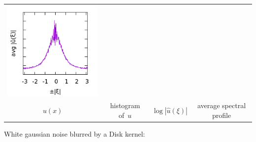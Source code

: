 \begin{tabular}{cccc}
	\includegraphics{l256_p.png} \\
	$u(x)$ &
	histogram of~$u$ &
	$\log|\hat u(\xi)|$ &
	average spectral profile
\end{tabular}


White gaussian noise blurred by a Disk kernel:


